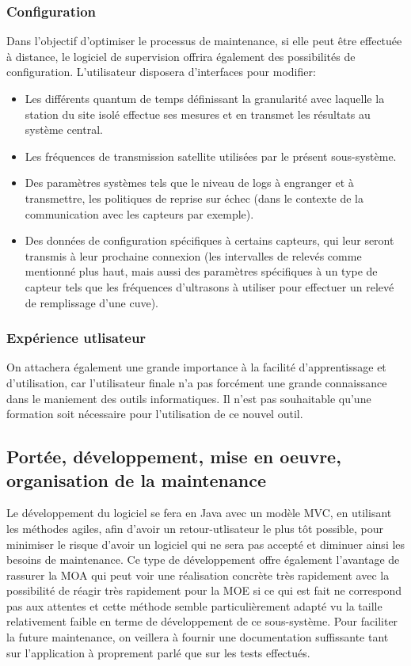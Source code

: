 \subsubsection{Configuration}
Dans l'objectif d'optimiser le processus de maintenance, si elle peut être effectuée à distance, le logiciel de supervision offrira également des possibilités de configuration.
L'utilisateur disposera d'interfaces pour modifier:
\begin{itemize}
	\item Les différents quantum de temps définissant la granularité avec laquelle la station du site isolé effectue ses mesures et en transmet les résultats au système central.
	\item Les fréquences de transmission satellite utilisées par le présent sous-système.
	\item Des paramètres systèmes tels que le niveau de logs à engranger et à transmettre, les politiques de reprise sur échec (dans le contexte de la communication avec les capteurs par exemple).
	\item Des données de configuration spécifiques à certains capteurs, qui leur seront transmis à leur prochaine connexion (les intervalles de relevés comme mentionné plus haut, mais aussi des paramètres spécifiques à un type de capteur tels que les fréquences d'ultrasons à utiliser pour effectuer un relevé de remplissage d'une cuve).
\end{itemize}

\subsubsection{Expérience utlisateur}
On attachera également une grande importance à la facilité d'apprentissage et d'utilisation, car l'utilisateur finale n'a pas forcément une grande connaissance dans le maniement des outils informatiques. Il n'est pas souhaitable qu'une formation soit nécessaire pour l'utilisation de ce nouvel outil.

\subsection{Portée, développement, mise en oeuvre, organisation de la maintenance}
Le développement du logiciel se fera en Java avec un modèle MVC, en utilisant les méthodes agiles, afin d'avoir un retour-utlisateur le plus tôt possible, pour minimiser le risque d'avoir un logiciel qui ne sera pas accepté et diminuer ainsi les besoins de maintenance. Ce type de développement offre également l'avantage de rassurer la MOA qui peut voir une réalisation concrète très rapidement avec la possibilité de réagir très rapidement pour la MOE si ce qui est fait ne correspond pas aux attentes et cette méthode semble particulièrement adapté vu la taille relativement faible en terme de développement de ce sous-système. 
Pour faciliter la future maintenance, on veillera à fournir une documentation suffissante tant sur l'application à proprement parlé que sur les tests effectués.

